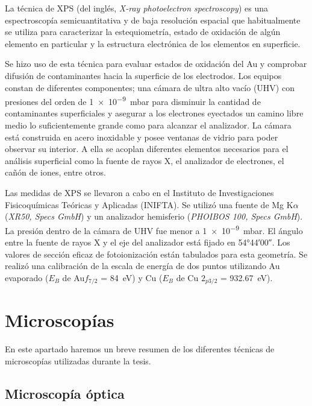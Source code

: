 		La técnica de XPS (del inglés, \textit {X-ray photoelectron spectroscopy}) es una espectroscopía semicuantitativa y de baja resolución espacial que habitualmente se utiliza para caracterizar la estequiometría, estado de oxidación de algún elemento en particular y la estructura electrónica de los elementos en superficie.\cite{siegbahn1956,siegbahn1981}

		Se hizo uso de esta técnica para evaluar estados de oxidación del Au y comprobar difusión de contaminantes hacia la superficie de los electrodos.  Los equipos constan de diferentes componentes; una cámara de ultra alto vacío (UHV) con presiones del orden de \SI{1e-9}{mbar} para disminuir la cantidad de contaminantes superficiales y asegurar a los electrones eyectados un camino libre medio lo suficientemente grande como para alcanzar el analizador. La cámara está construida en acero inoxidable y posee ventanas de vidrio para poder observar su interior. A ella se acoplan diferentes elementos necesarios para el análisis superficial como la fuente de rayos X, el analizador de electrones, el cañón de iones, entre otros.\cite{XPS1978,Corthey2012}

		Las medidas de XPS se llevaron a cabo en el Instituto de Investigaciones Fisicoquímicas Teóricas y Aplicadas (INIFTA). Se utilizó una fuente de Mg K$\alpha$ (\textit{XR50, Specs GmbH}) y un analizador hemisferio (\textit{PHOIBOS 100, Specs GmbH}). La presión dentro de la cámara de UHV fue menor a \SI{1e-9}{mbar}. El ángulo entre la fuente de rayos X y el eje del analizador está fijado en \ang{54;44;00}. Los valores de sección eficaz de fotoionización están tabulados para esta geometría. Se realizó una calibración de la escala de energía de dos puntos utilizando Au evaporado ($E_B$ de Au$f_{7/2}$ = \SI{84}{\electronvolt}) y Cu ($E_B$ de Cu $2_{p3/2}$ = \SI{932.67}{\electronvolt}).
		
\vspace*{-0.11cm}\section{Microscopías}\label{sec:micros}
		
	 En este apartado haremos un breve resumen de los diferentes técnicas de microscopías utilizadas durante la tesis.

	\vspace*{-0.12cm}\subsection{Microscopía óptica}

